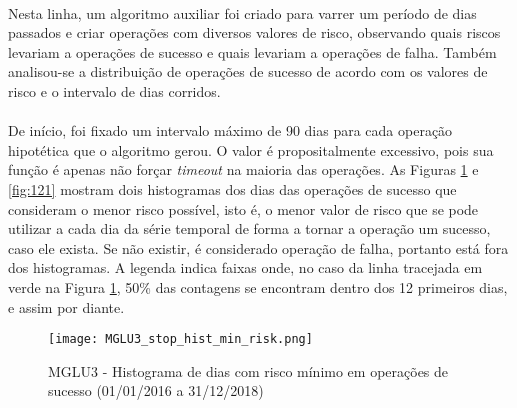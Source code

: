 

\paragraph{} Nesta linha, um algoritmo auxiliar foi criado para varrer um período de dias passados e criar operações com diversos valores de risco, observando quais riscos levariam a operações de sucesso e quais levariam a operações de falha. Também analisou-se a distribuição de operações de sucesso de acordo com os valores de risco e o intervalo de dias corridos.

\paragraph{} De início, foi fixado um intervalo máximo de 90 dias para cada operação hipotética que o algoritmo gerou. O valor é propositalmente excessivo, pois sua função é apenas não forçar \textit{timeout} na maioria das operações. As Figuras \ref{fig:120} e \ref{fig:121} mostram dois histogramas dos dias das operações de sucesso que consideram o menor risco possível, isto é, o menor valor de risco que se pode utilizar a cada dia da série temporal de forma a tornar a operação um sucesso, caso ele exista. Se não existir, é considerado operação de falha, portanto está fora dos histogramas. A legenda indica faixas onde, no caso da linha tracejada em verde na Figura \ref{fig:120}, 50\% das contagens se encontram dentro dos 12 primeiros dias, e assim por diante.

\begin{figure}[!htb]
    \texttt{[image: MGLU3\_stop\_hist\_min\_risk.png]}
    \centering
    \caption{MGLU3 - Histograma de dias com risco mínimo em operações de sucesso (01/01/2016 a 31/12/2018)}
    \label{fig:120}
\end{figure}

